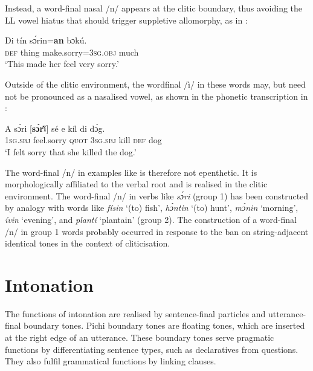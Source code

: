 \z

Instead, a word-final nasal /n/ appears at the clitic boundary, thus avoiding the LL vowel hiatus that should trigger suppletive allomorphy, as in :


\ea%
    \label{ex:key:78}
    \gll   Di  tín    sɔ́rin=\textbf{an}         bɔkú.   \\
\textsc{def}  thing  make.sorry=\textsc{3sg.obj}  much\\

\glt ‘This made her feel very sorry.’
\z

Outside of the clitic environment, the wordfinal /ì/ in these words may, but need not be pronounced as a nasalised vowel, as shown in the phonetic transcription in :


\ea%
    \label{ex:key:79}
    \gll   A    sɔ́ri [\textbf{sɔ́r\`{ĩ}}]  sé    e    kíl  di  dɔ́g.\\
\textsc{1sg.sbj}  feel.sorry  {}   \textsc{quot}    \textsc{3sg.sbj}  kill  \textsc{def}  dog\\

\glt ‘I felt sorry that she killed the dog.’
\z

The word-final /n/ in examples like  is therefore not epenthetic. It is morphologically affiliated to the verbal root and is realised in the clitic environment. The word-final /n/ in verbs like \textit{sɔ́ri} (group 1) has been constructed by analogy with words like \textit{físin} ‘(to) fish’, \textit{hɔ́ntin} ‘(to) hunt’, \textit{mɔ́nin} ‘morning’, \textit{ívin} ‘evening’, and \textit{plantí} ‘plantain’ (group 2). The construction of a word-final /n/ in group 1 words probably occurred in response to the ban on string-adjacent identical tones in the context of cliticisation.

\section{Intonation}\label{sec:3.4}

The functions of intonation are realised by sentence-final particles and utterance-final boundary tones. Pichi boundary tones are floating tones, which are inserted at the right edge of an utterance. These boundary tones serve pragmatic functions by differentiating sentence types, such as declaratives from questions. They also fulfil grammatical functions by linking clauses.


